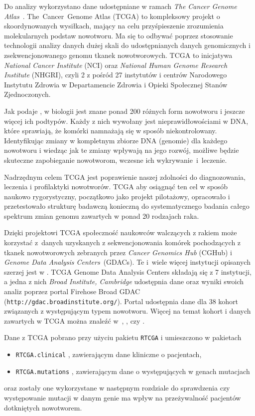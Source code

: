 Do analizy wykorzystano dane udostępniane w ramach \textit{The Cancer Genome Atlas}~\cite{broad}. The~Cancer~Genome Atlas (TCGA) to kompleksowy projekt o skoordynowanych wysiłkach, mający na celu przyśpieszenie zrozumienia molekularnych podstaw nowotworu. Ma się to odbywać poprzez stosowanie technologii analizy danych dużej skali do udostępnianych danych genomicznych i zsekwencjonowanego genomu tkanek nowotworowych. TCGA to inicjatywa \textit{National Cancer Institute} (NCI) oraz \textit{National Human Genome Research Institute} (NHGRI), czyli 2 z pośród 27 instytutów i centrów Narodowego Instytutu Zdrowia w Departamencie Zdrowia i Opieki Społecznej Stanów Zjednoczonych.

Jak podaje \cite{patrycja}, w biologii jest znane ponad 200 różnych form nowotworu i jeszcze więcej ich podtypów. Każdy z nich wywołany jest nieprawidłowościami w DNA, które sprawiają, że komórki namnażają się w sposób niekontrolowany. Identyfikując zmiany w kompletnym zbiorze DNA (genomie) dla każdego nowotworu i wiedząc jak te zmiany wpływają na jego rozwój, możliwe będzie skuteczne zapobieganie nowotworom, wczesne ich wykrywanie~i~leczenie. 

Nadrzędnym celem TCGA jest poprawienie naszej zdolności do diagnozowania, leczenia i profilaktyki nowotworów. TCGA aby osiągnąć ten cel w sposób naukowo rygorystyczny, początkowo jako projekt pilotażowy, opracowało i przetestowało strukturę badawczą konieczną do systematycznego badania całego spektrum zmian genomu zawartych w ponad 20 rodzajach raka.

Dzięki projektowi TCGA społeczność naukowców walczących z rakiem może korzystać z~danych uzyskanych z sekwencjonowania komórek pochodzących z tkanek nowotworowych zebranych przez \textit{Cancer Genomics Hub} (CGHub) i \textit{Genome Data Analysis Centers}~(GDACs). Te i~wiele więcej instytucji opisanych szerzej jest w \cite{patrycja}. TCGA Genome Data Analysis Centers składają się z 7 instytucji, a jedna z nich \textit{Broad Institute, Cambridge} udostępnia dane oraz wyniki swoich analiz poprzez portal Firehose Broad GDAC (\texttt{http://gdac.broadinstitute.org/}). Portal udostępnia dane dla 38 kohort związanych z występującym typem nowotworu. Więcej na temat kohort i danych zawartych w TCGA można znaleźć w~\cite{chin1}, \cite{chin2}, \cite{future} czy \cite{patrycja}. 

Dane z TCGA pobrano przy użyciu pakietu \texttt{RTCGA} \cite{kosa1} i umieszczono w pakietach
\begin{itemize}
\item \texttt{RTCGA.clinical} \cite{kosa2}, zawierającym dane kliniczne o pacjentach,
\item \texttt{RTCGA.mutations} \cite{kosa3}, zawierającym dane o występujących w genach mutacjach
\end{itemize} 
oraz zostały one wykorzystane w następnym rozdziale do sprawdzenia czy występowanie mutacji w danym genie ma wpływ na przeżywalność pacjentów dotkniętych nowotworem.

